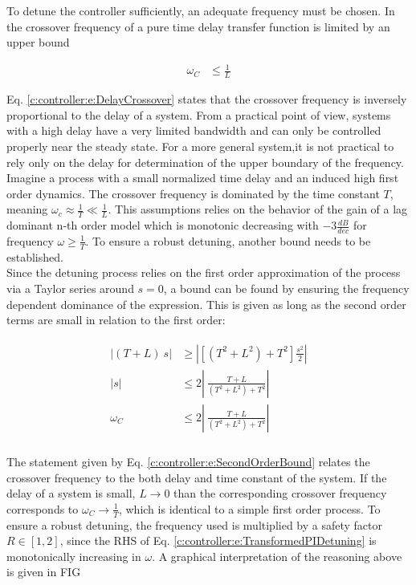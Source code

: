 To detune the controller sufficiently, an adequate frequency must be chosen. In \cite[p.172 f.]{Skogestad2005} the crossover frequency of a pure time delay transfer function is limited by an upper bound

\begin{align}
\omega_C &\leq \frac{1}{L}
\label{c:controller:e:DelayCrossover}
\end{align}

Eq. \ref{c:controller:e:DelayCrossover} states that the crossover frequency is inversely proportional to the delay of a system. From a practical point of view, systems with a high delay have a very limited bandwidth and can only be controlled properly near the steady state. For a more general system,it is not practical to rely only on the delay for determination of the upper boundary of the frequency. Imagine a process with a small normalized time delay and an induced high first order dynamics. The crossover frequency is dominated by the time constant $T$, meaning $\omega_c \approx \frac{1}{T} \ll \frac{1}{L}$. This assumptions relies on the behavior of the gain of a lag dominant n-th order model which is monotonic decreasing with $-3 \frac{dB}{dec}$ for frequency $\omega \geq \frac{1}{T}$. To ensure a robust detuning, another bound needs to be established.\\

Since the detuning process relies on the first order approximation of the process via a Taylor series around $s=0$, a bound can be found by ensuring the frequency dependent dominance of the expression. This is given as long as the second order terms are small in relation to the first order:

\begin{align}
\begin{split}
\left|(T+L)~s \right| &\geq \left| \left[(T^2 + L^2) + T^2 \right] \frac{s^2}{2} \right|\\
\left| s \right| & \leq 2 \left| ~\frac{T+L}{(T^2+L^2)+T^2} \right| \\
\omega_C & \leq 2 \left| ~\frac{T+L}{(T^2+L^2)+T^2} \right| \\
\end{split}
\label{c:controller:e:SecondOrderBound}
\end{align}

The statement given by Eq. \ref{c:controller:e:SecondOrderBound} relates the crossover frequency to the both delay and time constant of the system. If the delay of a system is small, $L \to 0$ than the corresponding crossover frequency corresponds to $\omega_C \to \frac{1}{T}$, which is identical to a simple first order process. To ensure a robust detuning, the frequency used is multiplied by a safety factor $R \in \left[1,2\right]$, since the RHS of Eq. \ref{c:controller:e:TransformedPIDetuning} is monotonically increasing in $\omega$. A graphical interpretation of the reasoning above is given in FIG\\

